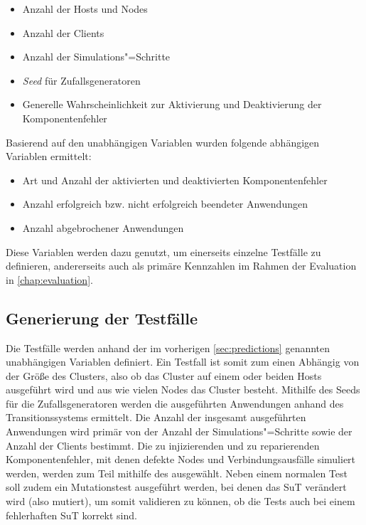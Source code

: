 \begin{itemize}
    \item Anzahl der Hosts und Nodes
    \item Anzahl der Clients
    \item Anzahl der Simulations"=Schritte
    \item \emph{Seed} für Zufallsgeneratoren
    \item Generelle Wahrscheinlichkeit zur Aktivierung und Deaktivierung der Komponentenfehler
\end{itemize}

Basierend auf den unabhängigen Variablen wurden folgende abhängigen Variablen ermittelt:

\begin{itemize}
    \item Art und Anzahl der aktivierten und deaktivierten Komponentenfehler
    \item Anzahl erfolgreich bzw. nicht erfolgreich beendeter Anwendungen
    \item Anzahl abgebrochener Anwendungen
\end{itemize}

Diese Variablen werden dazu genutzt, um einerseits einzelne Testfälle zu definieren, andererseits auch als primäre Kennzahlen im Rahmen der Evaluation in \autoref{chap:evaluation}.

\subsection{Generierung der Testfälle}
\label{sec:testcaseGeneration}

Die Testfälle werden anhand der im vorherigen \autoref{sec:predictions} genannten unabhängigen Variablen definiert.
Ein Testfall ist somit zum einen Abhängig von der Größe des Clusters, also ob das Cluster auf einem oder beiden Hosts ausgeführt wird und aus wie vielen Nodes das Cluster besteht.
Mithilfe des Seeds für die Zufallsgeneratoren werden die ausgeführten Anwendungen anhand des Transitionssystems ermittelt.
Die Anzahl der insgesamt ausgeführten Anwendungen wird primär von der Anzahl der Simulations"=Schritte sowie der Anzahl der Clients bestimmt.
Die zu injizierenden und zu reparierenden Komponentenfehler, mit denen defekte Nodes und Verbindungsausfälle simuliert werden, werden zum Teil mithilfe des ausgewählt.
Neben einem normalen Test soll zudem ein Mutationstest ausgeführt werden, bei denen das \ac{SuT} verändert wird (also mutiert), um somit validieren zu können, ob die Tests auch bei einem fehlerhaften \ac{SuT} korrekt sind.

